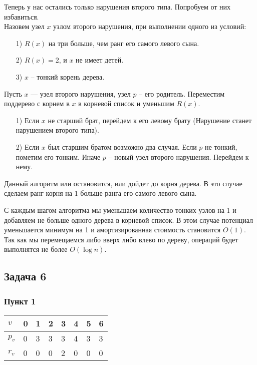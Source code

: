 \documentclass{article}
\begin{document}
	Теперь у нас остались только нарушения второго типа. Попробуем от них избавиться. \\
	
	Назовем узел $x$ узлом второго нарушения, при выполнении одного из условий:
	\begin{itemize}
	    \item[1)] $R(x)$ на три больше, чем ранг его самого левого сына.
	    \item[2)] $R(x) = 2$, и $x$ не имеет детей.
	    \item[3)] $x$ -- тонкий корень дерева.
	\end{itemize}
	

    Пусть $x$ — узел второго нарушения, узел $p$ -- его родитель. Переместим поддерево с корнем в $x$ в корневой список и уменьшим $R(x)$.
	\begin{itemize}
	    \item[1)] Если $x$ не старший брат, перейдем к его левому брату (Нарушение станет нарушением второго типа).
	    \item[2)] Если $x$ был старшим братом возможно два случая. Если $p$ не тонкий, пометим его тонким. Иначе $p$ -- новый узел второго нарушения. Перейдем к нему.
	\end{itemize}
    
    Данный алгоритм или остановится, или дойдет до корня дерева. В это случае сделаем ранг корня на 1 больше ранга его самого левого сына.
    
    
    С каждым шагом алгоритма мы уменьшаем количество тонких узлов на 1 и добавляем не больше одного дерева в корневой список. В этом случае потенциал уменьшается минимум на 1 и амортизированная стоимость становится $O(1)$. \\
   
    Так как мы перемещаемся либо вверх либо влево по дереву, операций будет выполнятся не более $O(\log n)$.



	
	
	\subsection*{Задача 6}
	
	\subsubsection*{Пункт 1} 
	\begin{tabular}{ | l | l | l | l | l | l | l | l | }
    \hline
    $v$     & 0 & 1 & 2 & 3 & 4 & 5 & 6 \\ \hline
    $p_{v}$ & 0 & 3 & 3 & 3 & 4 & 3 & 3 \\ \hline
    $r_{v}$ & 0 & 0 & 0 & 2 & 0 & 0 & 0 \\ \hline
    \end{tabular}
	
\end{document}
